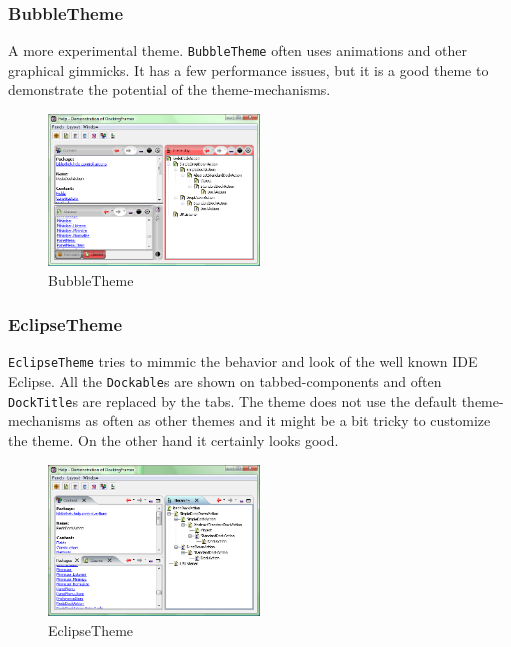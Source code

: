 \documentclass[a4paper,10pt]{article}
\newcommand{\src}[1]{\texttt{#1}}
\begin{document}
\subsubsection{BubbleTheme}
A more experimental theme. \src{BubbleTheme} often uses animations and other graphical gimmicks. It has a few performance issues, but it is a good theme to demonstrate the potential of the theme-mechanisms.

\begin{figure}[ht]
\centering
\includegraphics[width=0.5\textwidth]{theme_bubble}
\caption{BubbleTheme}
\label{fig:theme_bubble}
\end{figure}

\subsubsection{EclipseTheme}
\src{EclipseTheme} tries to mimmic the behavior and look of the well known IDE Eclipse. All the \src{Dockable}s are shown on tabbed-components and often \linebreak \src{DockTitle}s are replaced by the tabs. The theme does not use the default theme-mechanisms as often as other themes and it might be a bit tricky to customize the theme. On the other hand it certainly looks good.

\begin{figure}[ht]
\centering
\includegraphics[width=0.5\textwidth]{theme_eclipse}
\caption{EclipseTheme}
\label{fig:theme_eclipse}
\end{figure}
\end{document}
